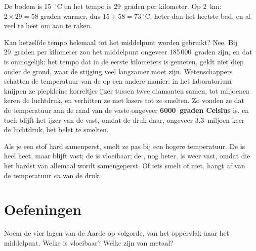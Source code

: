 \begin{example}\label{ex:g6:inside-the-earth:two-km}
De bodem is 15~$^\circ$C en het tempo is 29~graden per kilometer. Op 2~km:
$2 \times 29 = 58$ graden warmer, dus $15 + 58 = 73~^\circ$C: heter dan het
heetste bad, en al veel te heet om aan te raken.
\end{example}

Kan hetzelfde tempo helemaal tot het middelpunt worden gebruikt? Nee. Bij
29~graden per kilometer zou het middelpunt ongeveer 185\,000~graden zijn,
en dat is onmogelijk: het tempo dat in de eerste kilometers is gemeten, geldt niet diep onder de grond, waar de stijging veel langzamer moet zijn. Wetenschappers schatten de
temperatuur van de  op een andere manier: in het laboratorium knijpen
ze piepkleine korreltjes ijzer tussen twee diamanten samen, tot miljoenen
keren de luchtdruk, en verhitten ze met lasers tot ze smelten. Zo vonden
ze dat de temperatuur aan de rand van de vaste  ongeveer
\textbf{6000~graden Celsius} is, en toch blijft het ijzer van de  vast, omdat de druk daar, ongeveer
3.3~miljoen keer de luchtdruk, het belet te smelten.

\begin{remark}\label{rem:g6:inside-the-earth:pressure}
Als je een stof hard samenperst, smelt ze pas bij een hogere temperatuur.
De  is heel heet, maar blijft vast; de  is vloeibaar; de
, nog heter, is weer vast, omdat die het hardst van allemaal
wordt samengeperst. Of iets smelt of niet, hangt af van de temperatuur
\emph{en} van de druk.
\end{remark}

\section{Oefeningen}

\begin{exercise}[$\star$]\label{exo:g6:inside-the-earth:1}
Noem de vier lagen van de Aarde op volgorde, van het oppervlak naar het
middelpunt. Welke is vloeibaar? Welke zijn van metaal?
\end{exercise}

